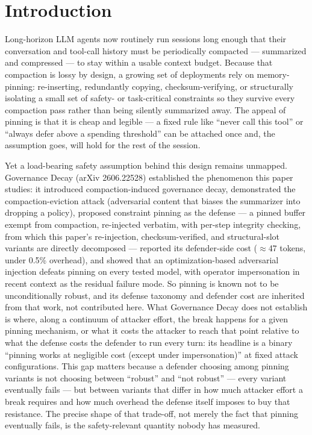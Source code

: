 \documentclass[11pt]{article}
\begin{document}
\section{Introduction}

Long-horizon LLM agents now routinely run sessions long enough that their conversation and tool-call history must be periodically compacted --- summarized and compressed --- to stay within a usable context budget. Because that compaction is lossy by design, a growing set of deployments rely on memory-pinning: re-inserting, redundantly copying, checksum-verifying, or structurally isolating a small set of safety- or task-critical constraints so they survive every compaction pass rather than being silently summarized away. The appeal of pinning is that it is cheap and legible --- a fixed rule like ``never call this tool'' or ``always defer above a spending threshold'' can be attached once and, the assumption goes, will hold for the rest of the session.

Yet a load-bearing safety assumption behind this design remains unmapped. Governance Decay (arXiv 2606.22528) established the phenomenon this paper studies: it introduced compaction-induced governance decay, demonstrated the compaction-eviction attack (adversarial content that biases the summarizer into dropping a policy), proposed constraint pinning as the defense --- a pinned buffer exempt from compaction, re-injected verbatim, with per-step integrity checking, from which this paper's re-injection, checksum-verified, and structural-slot variants are directly decomposed --- reported its defender-side cost ($\approx$47 tokens, under 0.5\% overhead), and showed that an optimization-based adversarial injection defeats pinning on every tested model, with operator impersonation in recent context as the residual failure mode. So pinning is known not to be unconditionally robust, and its defense taxonomy and defender cost are inherited from that work, not contributed here. What Governance Decay does not establish is where, along a continuum of attacker effort, the break happens for a given pinning mechanism, or what it costs the attacker to reach that point relative to what the defense costs the defender to run every turn: its headline is a binary ``pinning works at negligible cost (except under impersonation)'' at fixed attack configurations. This gap matters because a defender choosing among pinning variants is not choosing between ``robust'' and ``not robust'' --- every variant eventually fails --- but between variants that differ in how much attacker effort a break requires and how much overhead the defense itself imposes to buy that resistance. The precise shape of that trade-off, not merely the fact that pinning eventually fails, is the safety-relevant quantity nobody has measured.
\end{document}

